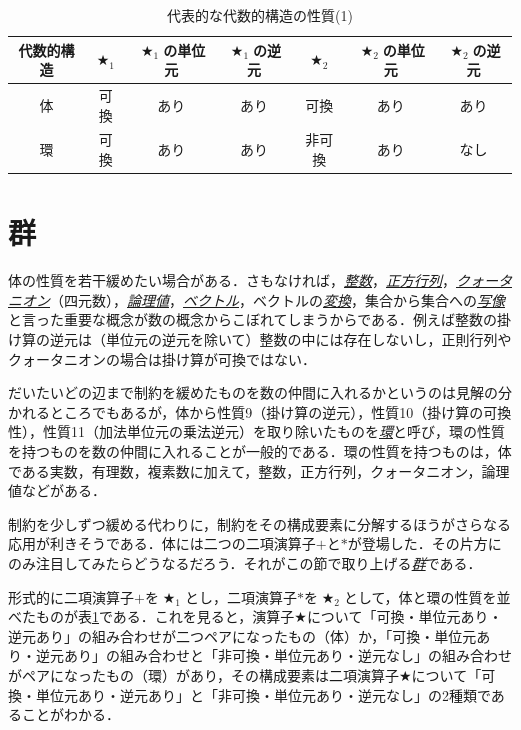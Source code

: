 \documentclass[a4paper]{jsbook}
\newcommand{\keyword}[1]{{\underline{\emph{#1}}}}
\newcommand{\mathAnyBinaryOperator}{\mathbin{\bigstar}}
\begin{document}
\begin{table}
\caption{代表的な代数的構造の性質(1)}
\label{tab:field-and-ring}
\begin{center}
\begin{tabular}{||c||c|c|c|c|c|c||}
\hline
代数的構造&$\mathAnyBinaryOperator_1$&$\mathAnyBinaryOperator_1$の単位元&$\mathAnyBinaryOperator_1$の逆元&$\mathAnyBinaryOperator_2$&$\mathAnyBinaryOperator_2$の単位元&$\mathAnyBinaryOperator_2$の逆元\\
\hline\hline
体&可換&あり&あり&可換&あり&あり\\
環&可換&あり&あり&非可換&あり&なし\\
\hline
\end{tabular}
\end{center}
\end{table}

\section{群}

体の性質を若干緩めたい場合がある．さもなければ，\keyword{整数}，\keyword{正方行列}，\keyword{クォータニオン}（四元数），\keyword{論理値}，\keyword{ベクトル}，ベクトルの\keyword{変換}，集合から集合への\keyword{写像}と言った重要な概念が数の概念からこぼれてしまうからである．例えば整数の掛け算の逆元は（単位元の逆元を除いて）整数の中には存在しないし，正則行列やクォータニオンの場合は掛け算が可換ではない．

だいたいどの辺まで制約を緩めたものを数の仲間に入れるかというのは見解の分かれるところでもあるが，体から性質9（掛け算の逆元），性質10（掛け算の可換性），性質11（加法単位元の乗法逆元）を取り除いたものを\keyword{環}と呼び，環の性質を持つものを数の仲間に入れることが一般的である．環の性質を持つものは，体である実数，有理数，複素数に加えて，整数，正方行列，クォータニオン，論理値などがある．

制約を少しずつ緩める代わりに，制約をその構成要素に分解するほうがさらなる応用が利きそうである．体には二つの二項演算子$+$と$*$が登場した．その片方にのみ注目してみたらどうなるだろう．それがこの節で取り上げる\keyword{群}である．

形式的に二項演算子$+$を$\mathAnyBinaryOperator_1$とし，二項演算子$*$を$\mathAnyBinaryOperator_2$として，体と環の性質を並べたものが表\ref{tab:field-and-ring}である．これを見ると，演算子$\mathAnyBinaryOperator$について「可換・単位元あり・逆元あり」の組み合わせが二つペアになったもの（体）か，「可換・単位元あり・逆元あり」の組み合わせと「非可換・単位元あり・逆元なし」の組み合わせがペアになったもの（環）があり，その構成要素は二項演算子$\mathAnyBinaryOperator$について「可換・単位元あり・逆元あり」と「非可換・単位元あり・逆元なし」の2種類であることがわかる．
\end{document}

